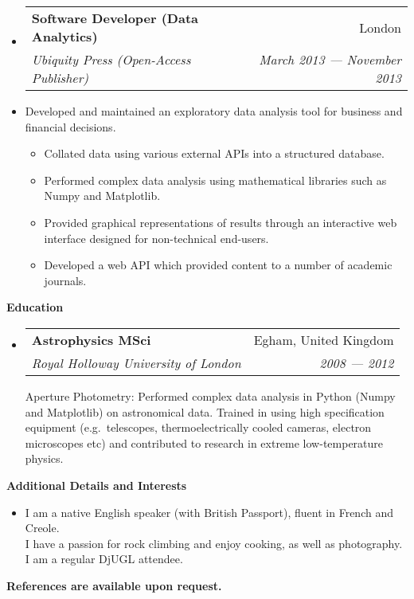 \documentclass[letterpaper,11pt]{article}
\makeatletter
\newlength{\headinglength}
\newcommand{\resheading}[1]{{\large \colorbox{mygrey}
        {\begin{minipage}{\headinglength}
            {\textbf{#1 \vphantom{p\^{E}}}}
        \end{minipage}}}}
\newcommand{\ressubheading}[4]
    {\begin{tabular*}{180mm}{l@{\extracolsep{\fill}}r}
        \textbf{#1} & #2 \\
        \textit{#3} & \textit{#4} \\
    \end{tabular*}\vspace{-6pt}}
\newcommand{\resdescription}[1]{#1 \vspace{-0mm}}
\newcommand{\resitem}[1]{\item #1 \vspace{-2pt}}
\makeatother
\begin{document}
\begin{itemize}
        \item[]
            \ressubheading{Software Developer (Data Analytics)}{London}{Ubiquity Press (Open-Access Publisher)}{March 2013 --- November 2013}
        \item[]
            \resdescription{Developed and maintained an exploratory data analysis tool for business and financial decisions.}
            \begin{itemize}
                    \resitem{Collated data using various external APIs into a structured database.}
                    \resitem{Performed complex data analysis using mathematical libraries such as Numpy and Matplotlib.}
                    \resitem{Provided graphical representations of results through an interactive web interface designed for non-technical end-users.}
                    \resitem{Developed a web API which provided content to a number of academic journals.}
            \end{itemize}

    \end{itemize}

    \resheading{Education}
    \begin{itemize}
        \item[]
            \ressubheading{Astrophysics MSci }{Egham, United Kingdom}{Royal Holloway University of London}{2008 --- 2012}
            \vspace{0.2in}
            \vspace{0.0in}
            \resdescription{Aperture Photometry: Performed complex data analysis in Python (Numpy and Matplotlib) on astronomical data.
            Trained in using high specification equipment  (e.g.\ telescopes, thermoelectrically cooled cameras, electron microscopes etc) and contributed to research in extreme low-temperature physics.}

    \end{itemize}

    \resheading{Additional Details and Interests}
    \begin{itemize}
        \item[]
            I am a native English speaker (with British Passport), fluent in French and Creole.\\
            I have a passion for rock climbing and enjoy cooking, as well as photography. \\
            I am a regular DjUGL attendee.\\
    \end{itemize}

    \textbf{References are available upon request.}
\end{document}
